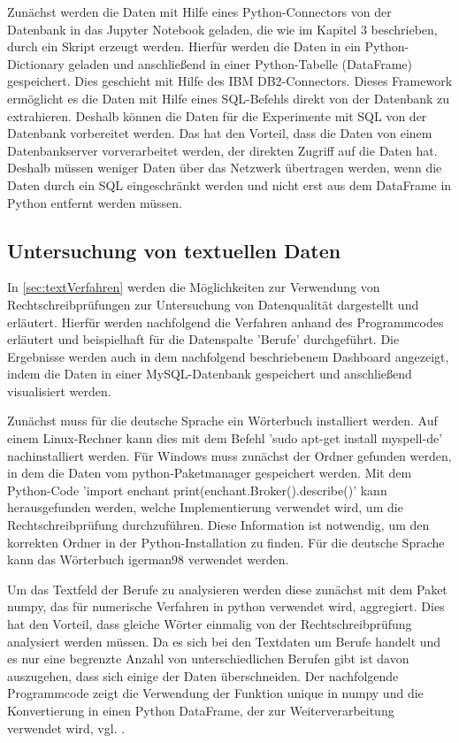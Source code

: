 Zunächst werden die Daten mit Hilfe eines Python-Connectors von der Datenbank in das Jupyter Notebook geladen, die wie im Kapitel 3 beschrieben, durch ein Skript erzeugt werden.
Hierfür werden die Daten in ein Python-Dictionary geladen und anschließend in einer Python-Tabelle (DataFrame) gespeichert. 
Dies geschieht mit Hilfe des IBM DB2-Connectors. 
Dieses Framework ermöglicht es die Daten mit Hilfe eines SQL-Befehls direkt von der Datenbank zu extrahieren.
Deshalb können die Daten für die Experimente mit SQL von der Datenbank vorbereitet werden.%
Das hat den Vorteil, dass die Daten von einem Datenbankserver vorverarbeitet werden, der direkten Zugriff auf die Daten hat.
Deshalb müssen weniger Daten über das Netzwerk übertragen werden, wenn die Daten durch ein SQL eingeschränkt werden und nicht erst aus dem DataFrame in Python entfernt werden müssen. 


\subsection{Untersuchung von textuellen Daten}
In \autoref{sec:textVerfahren} werden die Möglichkeiten zur Verwendung von Rechtschreibprüfungen zur Untersuchung von Datenqualität dargestellt und erläutert.
Hierfür werden nachfolgend die Verfahren anhand des Programmcodes erläutert und beispielhaft für die Datenspalte 'Berufe' durchgeführt. 
Die Ergebnisse werden auch in dem nachfolgend beschriebenem Dashboard angezeigt, indem die Daten in einer MySQL-Datenbank gespeichert und anschließend visualisiert werden. 


Zunächst muss für die deutsche Sprache ein Wörterbuch installiert werden. 
Auf einem Linux-Rechner kann dies mit dem Befehl 'sudo apt-get install myspell-de' nachinstalliert werden. 
Für Windows muss zunächst der Ordner gefunden werden, in dem die Daten vom python-Paketmanager gespeichert werden. \cite{https://pyenchant.github.io/pyenchant/install.html}
Mit dem Python-Code 'import enchant print(enchant.Broker().describe()' kann herausgefunden werden, welche Implementierung verwendet wird, um die Rechtschreibprüfung durchzuführen.
Diese Information ist notwendig, um den korrekten Ordner in der Python-Installation zu finden. 
Für die deutsche Sprache kann das Wörterbuch igerman98 \cite{https://www.j3e.de/ispell/igerman98/} verwendet werden. %

Um das Textfeld der Berufe zu analysieren werden diese zunächst mit dem Paket numpy, das für numerische Verfahren in python verwendet wird, aggregiert.
Dies hat den Vorteil, dass gleiche Wörter einmalig von der Rechtschreibprüfung analysiert werden müssen. 
Da es sich bei den Textdaten um Berufe handelt und es nur eine begrenzte Anzahl von unterschiedlichen Berufen gibt ist davon auszugehen, dass sich einige der Daten überschneiden. 
Der nachfolgende Programmcode zeigt die Verwendung der Funktion unique in numpy und die Konvertierung in einen Python DataFrame, der zur Weiterverarbeitung verwendet wird, vgl. \cite{https://numpy.org/doc/stable/reference/generated/numpy.unique.html}. \\


